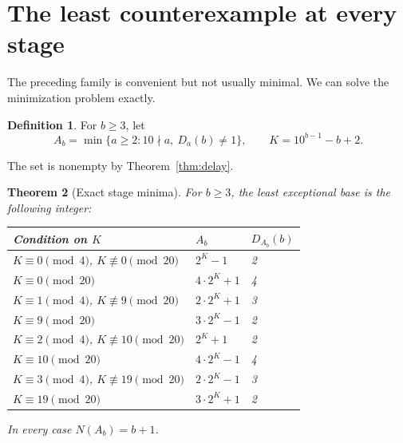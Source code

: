 \documentclass[11pt,a4paper]{article}
\newtheorem{theorem}{Theorem}[section]
\theoremstyle{definition}
\newtheorem{definition}[theorem]{Definition}
\begin{document}
\section{The least counterexample at every stage}\label{sec:minima}

The preceding family is convenient but not usually minimal. We can solve
the minimization problem exactly.

\begin{definition}
For $b\ge3$, let
\[
A_b=\min\{a\ge2:10\nmid a,\ D_a(b)\ne1\},
\qquad K=10^{b-1}-b+2.
\]
\end{definition}
The set is nonempty by Theorem~\ref{thm:delay}.

\begin{theorem}[Exact stage minima]\label{thm:stage-minima}
For $b\ge3$, the least exceptional base is the following integer:
\begin{center}
\begin{tabular}{lll}
\toprule
Condition on $K$ & $A_b$ & $D_{A_b}(b)$\\
\midrule
$K\equiv0\pmod4$, $K\not\equiv0\pmod{20}$ & $2^K-1$ & 2\\
$K\equiv0\pmod{20}$ & $4\cdot2^K+1$ & 4\\
$K\equiv1\pmod4$, $K\not\equiv9\pmod{20}$ & $2\cdot2^K+1$ & 3\\
$K\equiv9\pmod{20}$ & $3\cdot2^K-1$ & 2\\
$K\equiv2\pmod4$, $K\not\equiv10\pmod{20}$ & $2^K+1$ & 2\\
$K\equiv10\pmod{20}$ & $4\cdot2^K-1$ & 4\\
$K\equiv3\pmod4$, $K\not\equiv19\pmod{20}$ & $2\cdot2^K-1$ & 3\\
$K\equiv19\pmod{20}$ & $3\cdot2^K+1$ & 2\\
\bottomrule
\end{tabular}
\end{center}
In every case $N(A_b)=b+1$.
\end{theorem}
\end{document}
